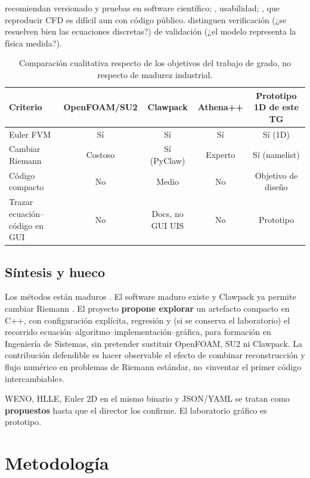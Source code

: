 \textcite{wilson2014} recomiendan versionado y pruebas en software científico; \textcite{ramakrishnan2017}, usabilidad; \textcite{mesnard2017}, que reproducir CFD es difícil aun con código público. \textcite{oberkampf2010} distinguen verificación (¿se resuelven bien las ecuaciones discretas?) de validación (¿el modelo representa la física medida?).

\begin{table}[htbp]
\centering
\small
\begin{tabular}{p{3.2cm}cccc}
\hline
Criterio & OpenFOAM/SU2 & Clawpack & Athena++ & Prototipo 1D de este TG \\
\hline
Euler FVM & Sí & Sí & Sí & Sí (1D) \\
Cambiar Riemann & Costoso & Sí (PyClaw) & Experto & Sí (namelist) \\
Código compacto & No & Medio & No & Objetivo de diseño \\
Trazar ecuación--código en GUI & No & Docs, no GUI UIS & No & Prototipo \\
\hline
\end{tabular}
\caption{Comparación cualitativa respecto de los objetivos del trabajo de grado, no respecto de madurez industrial.}
\end{table}

\section{Síntesis y hueco}

Los métodos están maduros \parencite{toro2009,leveque2002}. El software maduro existe y Clawpack ya permite cambiar Riemann \parencite{mandli2016}. El proyecto \textbf{propone explorar} un artefacto compacto en C++, con configuración explícita, regresión y (si se conserva el laboratorio) el recorrido ecuación--algoritmo--implementación--gráfica, para formación en Ingeniería de Sistemas, sin pretender sustituir OpenFOAM, SU2 ni Clawpack. La contribución defendible es hacer observable el efecto de combinar reconstrucción y flujo numérico en problemas de Riemann estándar, no «inventar el primer código intercambiable».

WENO, HLLE, Euler 2D en el mismo binario y JSON/YAML se tratan como \textbf{propuestos} hasta que el director los confirme. El laboratorio gráfico es prototipo.

\chapter{Metodología}

